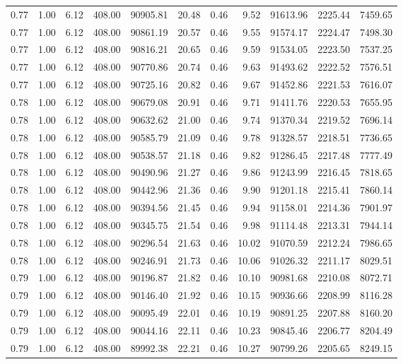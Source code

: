 \begin{table}[!ht]
\begin{tabular}{rrrrrrrrrrr}
0.77 & 1.00 & 6.12 & 408.00 & 90905.81 & 20.48 & 0.46 & 9.52 & 91613.96 & 2225.44 & 7459.65 \\
0.77 & 1.00 & 6.12 & 408.00 & 90861.19 & 20.57 & 0.46 & 9.55 & 91574.17 & 2224.47 & 7498.30 \\
0.77 & 1.00 & 6.12 & 408.00 & 90816.21 & 20.65 & 0.46 & 9.59 & 91534.05 & 2223.50 & 7537.25 \\
0.77 & 1.00 & 6.12 & 408.00 & 90770.86 & 20.74 & 0.46 & 9.63 & 91493.62 & 2222.52 & 7576.51 \\
0.77 & 1.00 & 6.12 & 408.00 & 90725.16 & 20.82 & 0.46 & 9.67 & 91452.86 & 2221.53 & 7616.07 \\
0.78 & 1.00 & 6.12 & 408.00 & 90679.08 & 20.91 & 0.46 & 9.71 & 91411.76 & 2220.53 & 7655.95 \\
0.78 & 1.00 & 6.12 & 408.00 & 90632.62 & 21.00 & 0.46 & 9.74 & 91370.34 & 2219.52 & 7696.14 \\
0.78 & 1.00 & 6.12 & 408.00 & 90585.79 & 21.09 & 0.46 & 9.78 & 91328.57 & 2218.51 & 7736.65 \\
0.78 & 1.00 & 6.12 & 408.00 & 90538.57 & 21.18 & 0.46 & 9.82 & 91286.45 & 2217.48 & 7777.49 \\
0.78 & 1.00 & 6.12 & 408.00 & 90490.96 & 21.27 & 0.46 & 9.86 & 91243.99 & 2216.45 & 7818.65 \\
0.78 & 1.00 & 6.12 & 408.00 & 90442.96 & 21.36 & 0.46 & 9.90 & 91201.18 & 2215.41 & 7860.14 \\
0.78 & 1.00 & 6.12 & 408.00 & 90394.56 & 21.45 & 0.46 & 9.94 & 91158.01 & 2214.36 & 7901.97 \\
0.78 & 1.00 & 6.12 & 408.00 & 90345.75 & 21.54 & 0.46 & 9.98 & 91114.48 & 2213.31 & 7944.14 \\
0.78 & 1.00 & 6.12 & 408.00 & 90296.54 & 21.63 & 0.46 & 10.02 & 91070.59 & 2212.24 & 7986.65 \\
0.78 & 1.00 & 6.12 & 408.00 & 90246.91 & 21.73 & 0.46 & 10.06 & 91026.32 & 2211.17 & 8029.51 \\
0.79 & 1.00 & 6.12 & 408.00 & 90196.87 & 21.82 & 0.46 & 10.10 & 90981.68 & 2210.08 & 8072.71 \\
0.79 & 1.00 & 6.12 & 408.00 & 90146.40 & 21.92 & 0.46 & 10.15 & 90936.66 & 2208.99 & 8116.28 \\
0.79 & 1.00 & 6.12 & 408.00 & 90095.49 & 22.01 & 0.46 & 10.19 & 90891.25 & 2207.88 & 8160.20 \\
0.79 & 1.00 & 6.12 & 408.00 & 90044.16 & 22.11 & 0.46 & 10.23 & 90845.46 & 2206.77 & 8204.49 \\
0.79 & 1.00 & 6.12 & 408.00 & 89992.38 & 22.21 & 0.46 & 10.27 & 90799.26 & 2205.65 & 8249.15 \\

\end{tabular}
\end{table}

